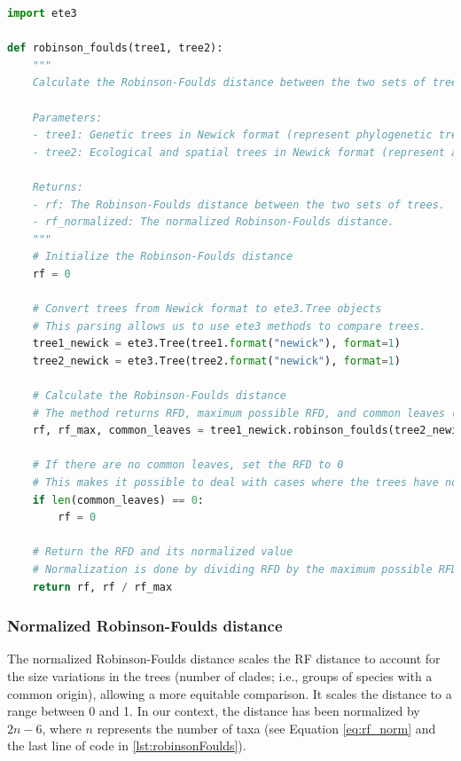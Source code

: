 \begin{lstlisting}[label=lst:robinsonFoulds,language=Python,caption=Python script for calculating the Robinson-Foulds Distance using the ete3 package in the aPhyloGeo package.]
import ete3

def robinson_foulds(tree1, tree2):
    """
    Calculate the Robinson-Foulds distance between the two sets of trees.

    Parameters:
    - tree1: Genetic trees in Newick format (represent phylogenetic trees in text form).
    - tree2: Ecological and spatial trees in Newick format (represent attributes trees in text form).

    Returns:
    - rf: The Robinson-Foulds distance between the two sets of trees.
    - rf_normalized: The normalized Robinson-Foulds distance.
    """
    # Initialize the Robinson-Foulds distance
    rf = 0

    # Convert trees from Newick format to ete3.Tree objects
    # This parsing allows us to use ete3 methods to compare trees.
    tree1_newick = ete3.Tree(tree1.format("newick"), format=1)
    tree2_newick = ete3.Tree(tree2.format("newick"), format=1)

    # Calculate the Robinson-Foulds distance
    # The method returns RFD, maximum possible RFD, and common leaves (i.e., taxa) between the trees.
    rf, rf_max, common_leaves = tree1_newick.robinson_foulds(tree2_newick, unrooted_trees=True)

    # If there are no common leaves, set the RFD to 0
    # This makes it possible to deal with cases where the trees have no overlapping taxa.
    if len(common_leaves) == 0:
        rf = 0

    # Return the RFD and its normalized value
    # Normalization is done by dividing RFD by the maximum possible RFD.
    return rf, rf / rf_max
\end{lstlisting}

\subsubsection{Normalized Robinson-Foulds distance}\label{RFnorm}
The normalized Robinson-Foulds distance scales the RF distance to account for the size variations in the trees (number of clades; i.e., groups of species with a common origin), allowing a more equitable comparison. It scales the distance to a range between 0 and 1. In our context, the distance has been normalized by $2n-6$, where $n$ represents the number of taxa (see Equation \eqref{eq:rf_norm} and the last line of code in \autoref{lst:robinsonFoulds}). 

